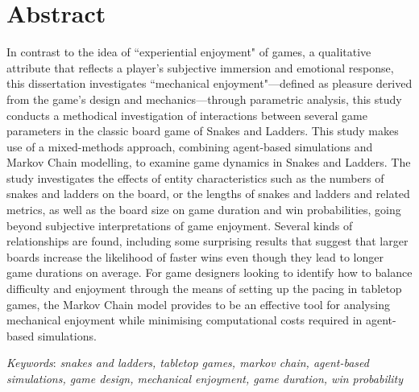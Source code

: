 \chapter*{Abstract}

In contrast to the idea of ``experiential enjoyment" of games, a qualitative attribute that reflects a player's subjective immersion and emotional response, this dissertation investigates ``mechanical enjoyment"—defined as pleasure derived from the game's design and mechanics—through parametric analysis, this study conducts a methodical investigation of interactions between several game parameters in the classic board game of Snakes and Ladders. This study makes use of a mixed-methods approach, combining agent-based simulations and Markov Chain modelling, to examine game dynamics in Snakes and Ladders. The study investigates the effects of entity characteristics such as the numbers of snakes and ladders on the board, or the lengths of snakes and ladders and related metrics, as well as the board size on game duration and win probabilities, going beyond subjective interpretations of game enjoyment. Several kinds of relationships are found, including some surprising results that suggest that larger boards increase the likelihood of faster wins even though they lead to longer game durations on average. For game designers looking to identify how to balance difficulty and enjoyment through the means of setting up the pacing in tabletop games, the Markov Chain model provides to be an effective tool for analysing mechanical enjoyment while minimising computational costs required in agent-based simulations.
\linebreak

\textit{Keywords}: \textit{snakes and ladders, tabletop games, markov chain, agent-based simulations, game design, mechanical enjoyment, game duration, win probability}